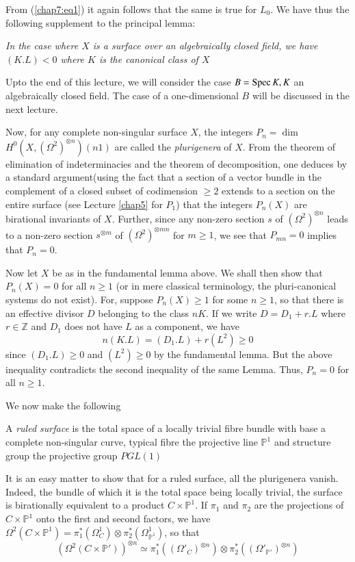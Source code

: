 From (\ref{chap7:eq1}) it again follows that the same is true for $L_0$. We have
thus the following supplement to the principal lemma: 

\textit{In the case where $X$ is a surface over an algebraically
  closed field, we have $(K.L)<0$ where $K$ is the canonical class of
  $X$} 

Upto the end of this lecture, we will consider the case $B=\operatorname{Spec} K, K$
an algebraically closed field. The case of a one-dimensional $B$ will
be discussed in the next lecture.	 

Now, for any complete non-singular surface $X$, the integers $P_n=\dim$
 $H^0(X,(\Omega ^2)^{\otimes n})(n 1)$ are called the
\textit{plurigenera} of $X$. From the theorem of elimination of
indeterminacies and the theorem of decomposition, one deduces by a
standard argument\pageoriginale (using the fact that a section of a
vector bundle in 
the complement of a closed subset of codimension $\geq 2$ extends to a
section on the entire surface (see Lecture \ref{chap5} for $P_1$) that the
integers $P_n(X)$ are birational invariants of $X$. Further, since any
non-zero section $s$ of $(\Omega^2)^{\otimes n}$ leads to a non-zero
section $s^{\otimes m}$ of $(\Omega^2)^{\otimes mn}$ for $m \geq 1$,
we see that $P_{mn}=0$ implies that $P_n=0$. 
 
Now let $X$ be as in the fundamental lemma above. We shall then show
that $P_{n}(X)=0$ for all $n \geq 1$ (or in mere classical
terminology, the pluri-canonical systems do not exist). For, suppose
$P_n(X)\geq 1$ for some $n \geq 1$, so that there is an effective
divisor $D$ belonging to the class $n K$. If we write $D=D_1+r.L$
where $r \in \mathbb{Z}$ and $D_1$ does not have $L$ as a component,
we have 
$$
n(K.L)=(D_1.L)+r(L^2)\geq 0
$$
 since $(D_1.L)\geq 0$ and $(L^2)\geq 0$ by the fundamental lemma. But
 the above inequality contradicts the second inequality of the same
 Lemma. Thus, $P_n=0$ for all $n \geq 1$. 
 
 We now make the following

\begin{defi*}%
  A {\em ruled surface} is the total space of a locally trivial fibre
  bundle with base a complete non-singular curve, typical fibre the
  projective line $\mathbb{P}^1$ and structure group the projective
  group $PGL(1)$ 
\end{defi*}
 
It is an easy matter to show that for a ruled surface, all the
plurigenera vanish. Indeed, the bundle of which it is the total space\pageoriginale
being locally trivial, the surface is birationally equivalent to a
product $C \times \mathbb{P}^1$. If $\pi_1$ and $\pi_2$ are the projections
of $C \times  \mathbb{P}^1$ onto the first and second factors, we have
$\Omega^2(C  \times \mathbb{P}^1)=\pi^*_1(\Omega^1_C)\otimes \pi^*_2
(\Omega^1_{\mathbb{P}^1})$, so that 
$$
(\Omega^2(C \times \mathbb{P'}))^{\otimes n} \simeq
\pi_1^*((\Omega'_C)^{\otimes n})\otimes
\pi_2^*((\Omega'_{\mathbb{P'}})^{\otimes n}) 
$$

